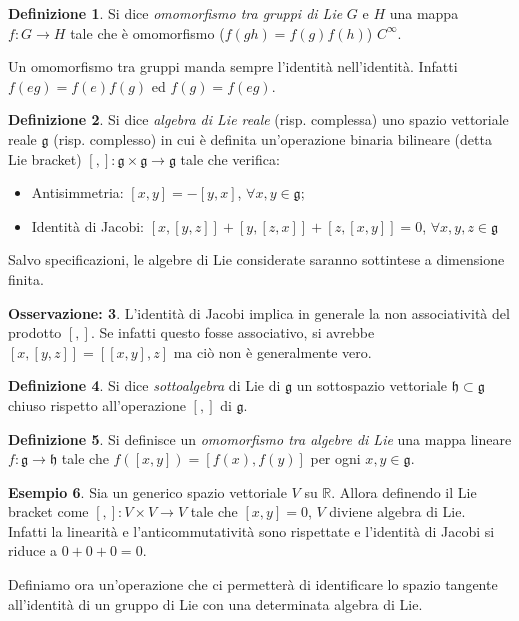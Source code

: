 \documentclass[12pt,a4paper]{report}
\theoremstyle{definition}
\newtheorem{Def}{Definizione}[chapter]
\theoremstyle{definition}
\newtheorem{Ex}[Def]{Esempio}
\theoremstyle{definition}
\theoremstyle{definition}
\newtheorem{Obs}[Def]{Osservazione:}
\begin{document}
\begin{Def}
	Si dice \textit{omomorfismo tra gruppi di Lie} $G$ e $H$ una mappa \\$f:G\rightarrow H$ tale che è omomorfismo ($f(gh)=f(g)f(h)$) $C^\infty$.
\end{Def}
Un omomorfismo tra gruppi manda sempre l'identità nell'identità. Infatti $f(eg)=f(e)f(g)$ ed $f(g)=f(eg)$.\\
\begin{Def}
	Si dice \textit{algebra di Lie reale} (risp. complessa) uno spazio vettoriale reale $\mathfrak{g}$ (risp. complesso) in cui è definita un'operazione binaria bilineare (detta Lie bracket) $[,]:\mathfrak{g}\times\mathfrak{g}\rightarrow\mathfrak{g}$ tale che verifica:
	\begin{itemize}
		\item Antisimmetria: $[x,y]=-[y,x]$, $\forall x,y\in\mathfrak{g}$;
		\item Identità di Jacobi: $[x,[y,z]]+[y,[z,x]]+[z,[x,y]]=0$, $\forall x,y,z\in \mathfrak{g}$ 
	\end{itemize}
\end{Def}
Salvo specificazioni, le algebre di Lie considerate saranno sottintese a dimensione finita.
\begin{Obs}
	L'identità di Jacobi implica in generale la non associatività del prodotto $[,]$. Se infatti questo fosse associativo, si avrebbe $[x,[y,z]]=[[x,y],z]$ ma ciò non è generalmente vero.
\end{Obs}
\begin{Def}
	Si dice \textit{sottoalgebra} di Lie di $\mathfrak{g}$ un sottospazio vettoriale $\mathfrak{h}\subset\mathfrak{g}$ chiuso rispetto all'operazione $[,]$ di $\mathfrak{g}$.
\end{Def}
\begin{Def}
	Si definisce un \textit{omomorfismo tra algebre di Lie} una mappa lineare $f:\mathfrak{g}\rightarrow\mathfrak{h}$ tale che $f([x,y])=[f(x),f(y)]$ per ogni $x,y\in\mathfrak{g}$.
\end{Def}
\begin{Ex}
	Sia un generico spazio vettoriale $V$ su $\mathbb{R}$. Allora definendo il Lie bracket come $[,]:V\times V\rightarrow V$ tale che $[x,y]=0$, $V$ diviene algebra di Lie.\\
	Infatti la linearità e l'anticommutatività sono rispettate e l'identità di Jacobi si riduce a $0+0+0=0$.
\end{Ex}
Definiamo ora un'operazione che ci permetterà di identificare lo spazio tangente all'identità di un gruppo di Lie con una determinata algebra di Lie.\\
\end{document}
